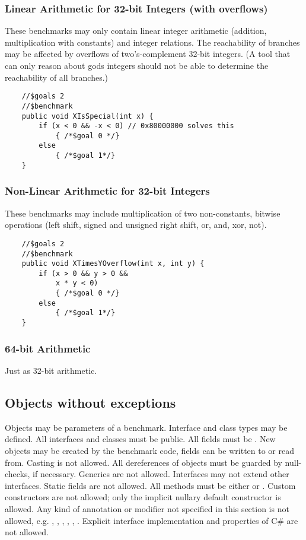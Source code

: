 \subsubsection{Linear Arithmetic for 32-bit Integers (with overflows)}

These benchmarks may only contain linear integer arithmetic (addition, multiplication with constants)
and integer relations. The reachability of branches may be affected by overflows of two's-complement 
32-bit integers. (A tool that can only reason about gods integers should not be able to 
determine the  reachability of all branches.)
\begin{verbatim}
    //$goals 2
    //$benchmark
    public void XIsSpecial(int x) {
        if (x < 0 && -x < 0) // 0x80000000 solves this
            { /*$goal 0 */}
        else
            { /*$goal 1*/}
    }
\end{verbatim}

\subsubsection{Non-Linear Arithmetic for 32-bit Integers}

These benchmarks may include multiplication of two non-constants,
bitwise operations (left shift, signed and unsigned right shift, or, and, xor, not).

\begin{verbatim}
    //$goals 2
    //$benchmark
    public void XTimesYOverflow(int x, int y) {
        if (x > 0 && y > 0 &&
            x * y < 0) 
            { /*$goal 0 */}
        else
            { /*$goal 1*/}
    }
\end{verbatim}

\subsubsection{64-bit Arithmetic}

Just as 32-bit arithmetic.

\subsection{Objects without exceptions}

Objects may be parameters of a benchmark. 
Interface and class types may be defined. 
All interfaces and classes must be public.
All fields must be .
New objects may be created by the benchmark code,
fields can be written to or read from.
Casting is not allowed.
All dereferences of objects must be guarded by null-checks,
if necessary.
Generics are not allowed.
Interfaces may not extend other interfaces.
Static fields are not allowed.
All methods must be either  or .
Custom constructors are not allowed; only the implicit nullary default constructor is allowed.
Any kind of annotation or modifier not specified in this section is not allowed,
e.g. , , , , , .
Explicit interface implementation and properties of C\# are not allowed.

